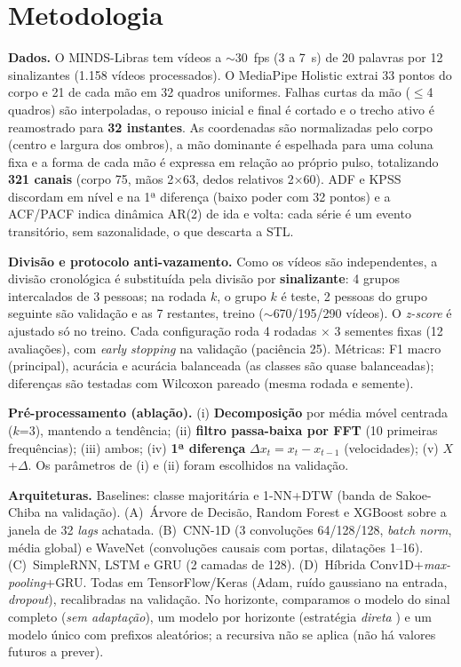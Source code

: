 \documentclass[12pt]{article}
\begin{document}
\section{Metodologia}

\textbf{Dados.} O MINDS-Libras \cite{rezende2021} tem vídeos a $\sim$30~fps (3 a 7~s) de 20 palavras por 12 sinalizantes (1.158 vídeos processados). O MediaPipe Holistic extrai 33 pontos do corpo e 21 de cada mão em 32 quadros uniformes. Falhas curtas da mão ($\le$4 quadros) são interpoladas, o repouso inicial e final é cortado e o trecho ativo é reamostrado para \textbf{32 instantes}. As coordenadas são normalizadas pelo corpo (centro e largura dos ombros), a mão dominante é espelhada para uma coluna fixa e a forma de cada mão é expressa em relação ao próprio pulso, totalizando \textbf{321 canais} (corpo 75, mãos 2$\times$63, dedos relativos 2$\times$60). ADF e KPSS discordam em nível e na 1ª diferença (baixo poder com 32 pontos) e a ACF/PACF indica dinâmica AR(2) de ida e volta: cada série é um evento transitório, sem sazonalidade, o que descarta a STL.

\textbf{Divisão e protocolo anti-vazamento.} Como os vídeos são independentes, a divisão cronológica é substituída pela divisão por \textbf{sinalizante}: 4 grupos intercalados de 3 pessoas; na rodada $k$, o grupo $k$ é teste, 2 pessoas do grupo seguinte são validação e as 7 restantes, treino ($\sim$670/195/290 vídeos). O \textit{z-score} é ajustado só no treino. Cada configuração roda 4 rodadas $\times$ 3 sementes fixas (12 avaliações), com \textit{early stopping} na validação (paciência 25). Métricas: F1 macro (principal), acurácia e acurácia balanceada (as classes são quase balanceadas); diferenças são testadas com Wilcoxon pareado (mesma rodada e semente).

\textbf{Pré-processamento (ablação).} (i) \textbf{Decomposição} por média móvel centrada ($k$=3), mantendo a tendência; (ii) \textbf{filtro passa-baixa por FFT} (10 primeiras frequências); (iii) ambos; (iv) \textbf{1ª diferença} $\Delta x_t = x_t - x_{t-1}$ (velocidades); (v) $X$+$\Delta$. Os parâmetros de (i) e (ii) foram escolhidos na validação.

\textbf{Arquiteturas.} Baselines: classe majoritária e 1-NN+DTW (banda de Sakoe-Chiba na validação). (A)~Árvore de Decisão, Random Forest e XGBoost sobre a janela de 32 \textit{lags} achatada. (B)~CNN-1D (3 convoluções 64/128/128, \textit{batch norm}, média global) e WaveNet \cite{oord2016} (convoluções causais com portas, dilatações 1--16). (C)~SimpleRNN, LSTM \cite{hochreiter1997} e GRU \cite{cho2014} (2 camadas de 128). (D)~Híbrida Conv1D+\textit{max-pooling}+GRU. Todas em TensorFlow/Keras (Adam, ruído gaussiano na entrada, \textit{dropout}), recalibradas na validação. No horizonte, comparamos o modelo do sinal completo (\textit{sem adaptação}), um modelo por horizonte (estratégia \textit{direta} \cite{bontempi2013}) e um modelo único com prefixos aleatórios; a recursiva não se aplica (não há valores futuros a prever).
\end{document}
